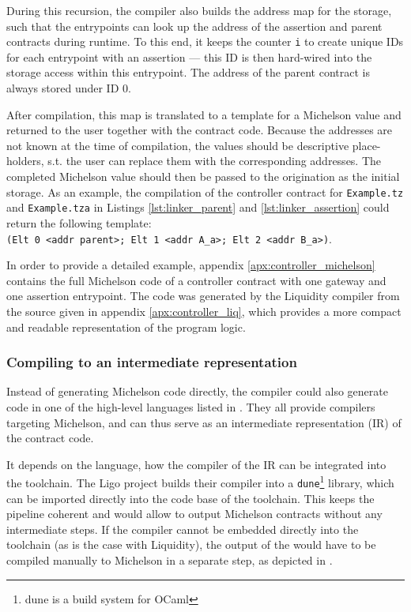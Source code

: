 During this recursion, the compiler also builds the address map for the storage, such that the entrypoints can look up the address of the assertion and parent contracts during runtime. To this end, it keeps the counter \texttt{i} to create unique IDs for each entrypoint with an assertion --- this ID is then hard-wired into the storage access within this entrypoint. The address of the parent contract is always stored under ID 0. 

After compilation, this map is translated to a template for a Michelson value and returned to the user together with the contract code. Because the addresses are not known at the time of compilation, the values should be descriptive place-holders, s.t. the user can replace them with the corresponding addresses. The completed Michelson value should then be passed to the origination as the initial storage. As an example, the compilation of the controller contract for \texttt{Example.tz} and \texttt{Example.tza} in Listings \ref{lst:linker_parent} and \ref{lst:linker_assertion} could return the following template:\\ \texttt{(Elt 0 <addr parent>; Elt 1 <addr A\_a>; Elt 2 <addr B\_a>)}.

In order to provide a detailed example, appendix \ref{apx:controller_michelson} contains the full Michelson code of a controller contract with one gateway and one assertion entrypoint. The code was generated by the Liquidity compiler from the source given in appendix \ref{apx:controller_liq}, which provides a more compact and readable representation of the program logic.

\subsubsection{Compiling to an intermediate representation}\label{sec:IR}
Instead of generating Michelson code directly, the compiler could also generate code in one of the high-level languages listed in . They all provide compilers targeting Michelson, and can thus serve as an intermediate representation (IR) of the contract code.

It depends on the language, how the compiler of the IR can be integrated into the toolchain. The Ligo project builds their compiler into a \texttt{dune}\footnote{dune \cite{dune} is a build system for OCaml} library, which can be imported directly into the code base of the toolchain. This keeps the pipeline coherent and would allow to output Michelson contracts without any intermediate steps. If the compiler cannot be embedded directly into the toolchain (as is the case with Liquidity), the output of the would have to be compiled manually to Michelson in a separate step, as depicted in .

